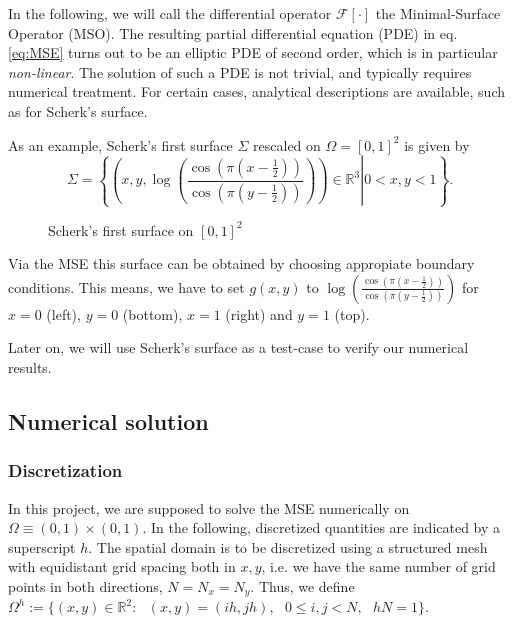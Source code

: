 \documentclass[11pt]{scrartcl}
\newcommand{\mSurf}[1]{\ensuremath{\mathcal{F}\left[#1\right]}}
\begin{document}
In the following, we will call the differential operator $\mSurf{\cdot}$ the Minimal-Surface Operator (MSO). The resulting partial differential equation (PDE) in eq. \eqref{eq:MSE} turns out to be an elliptic PDE of second order, which is in particular \textit{non-linear}. The solution of such a PDE is not trivial, and typically requires numerical treatment. For certain cases, analytical descriptions are available, such as for Scherk's surface.

As an example, Scherk's first surface $\Sigma$ rescaled on $\Omega = [0,1]^2$ is given by
\begin{equation}
	\Sigma = \left\{ \left. \left(x, y, \log \left( \frac{\cos (\pi(x-\frac{1}{2}))}{\cos (\pi(y-\frac{1}{2}))} \right) \right) \in \mathbb{R}^{3} \right  | 0 < x, y < 1 \right\}.
\end{equation} 
\begin{figure}
	\centering
	\caption{Scherk's first surface on $[0,1]^2$}
\end{figure}
Via the MSE this surface can be obtained by choosing appropiate boundary conditions. This means, we have to set $g(x,y)$ to $\log \left( \frac{\cos (\pi(x-\frac{1}{2}))}{\cos (\pi(y-\frac{1}{2}))} \right) $ for $x=0$ (left), $y=0$ (bottom), $x=1$ (right) and $y=1$ (top).

Later on, we will use Scherk's surface as a test-case to verify our numerical results.

\newpage
\subsection{Numerical solution}
\subsubsection{Discretization}
In this project, we are supposed to solve the MSE numerically on $\Omega \equiv (0,1)\times(0,1)$. In the following, discretized quantities are indicated by a superscript $h$. The spatial domain is to be discretized using a structured mesh with equidistant grid spacing both in $x,y$, i.e. we have the same number of grid points in both directions, $N=N_x=N_y$. Thus, we define $\Omega^h := \{ (x,y) \in \mathbb{R}^2:\text{ }(x,y) = (ih, jh), \text{ } 0 \le i,j < N,\text{ }hN=1\}$.
\end{document}
